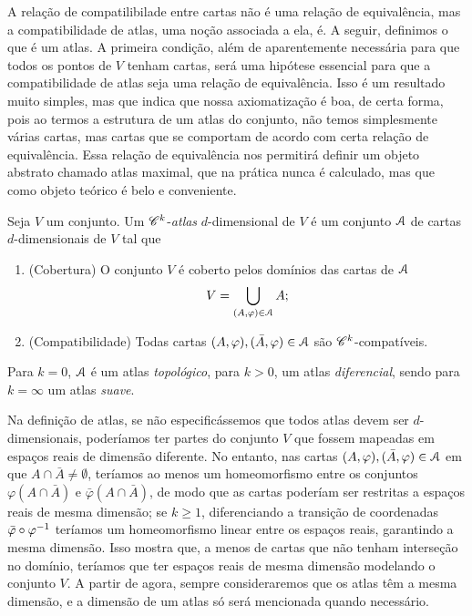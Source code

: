 A relação de compatilibilade entre cartas não é uma relação de equivalência, mas a compatibilidade de atlas, uma noção associada a ela, é. A seguir, definimos o que é um atlas. A primeira condição, além de aparentemente necessária para que todos os pontos de $V$ tenham cartas, será uma hipótese essencial para que a compatibilidade de atlas seja uma relação de equivalência. Isso é um resultado muito simples, mas que indica que nossa axiomatização é boa, de certa forma, pois ao termos a estrutura de um atlas do conjunto, não temos simplesmente várias cartas, mas cartas que se comportam de acordo com certa relação de equivalência. Essa relação de equivalência nos permitirá definir um objeto abstrato chamado atlas maximal, que na prática nunca é calculado, mas que como objeto teórico é belo e conveniente.

\begin{defi}
Seja $V$ um conjunto. Um $\mathscr{C}^k$-\emph{atlas} $d$-dimensional de $V$ é um conjunto $\mathcal{A}$ de cartas $d$-dimensionais de $V$ tal que
	\begin{enumerate}
	\item (Cobertura) O conjunto $V$ é coberto pelos domínios das cartas de $\mathcal{A}$
	\begin{equation*}
	V = \displaystyle\bigcup_{(A,\varphi) \in \mathcal{A}} A;
	\end{equation*}
	\item (Compatibilidade) Todas cartas $(A,\varphi), (\bar A,\varphi) \in \mathcal{A}$  são $\mathscr{C}^k$-compatíveis.
	\end{enumerate}
Para $k=0$, $\mathcal{A}$ é um atlas \emph{topológico}, para $k>0$, um atlas \emph{diferencial}, sendo para $k=\infty$ um atlas \emph{suave}.
\end{defi}

Na definição de atlas, se não especificássemos que todos atlas devem ser $d$-dimensionais, poderíamos ter partes do conjunto $V$ que fossem mapeadas em espaços reais de dimensão diferente. No entanto, nas cartas $(A,\varphi), (\bar A,\varphi) \in \mathcal{A}$ em que $A \cap \bar A \neq \emptyset$, teríamos ao menos um homeomorfismo entre os conjuntos $\varphi(A \cap \bar A)$ e $\bar\varphi(A \cap \bar A)$, de modo que as cartas poderíam ser restritas a espaços reais de mesma dimensão; se $k \geq 1$, diferenciando a transição de coordenadas $\bar\varphi \circ \varphi^{-1}$ teríamos um homeomorfismo linear entre os espaços reais, garantindo a mesma dimensão. Isso mostra que, a menos de cartas que não tenham interseção no domínio, teríamos que ter espaços reais de mesma dimensão modelando o conjunto $V$. A partir de agora, sempre consideraremos que os atlas têm a mesma dimensão, e a dimensão de um atlas só será mencionada quando necessário.

